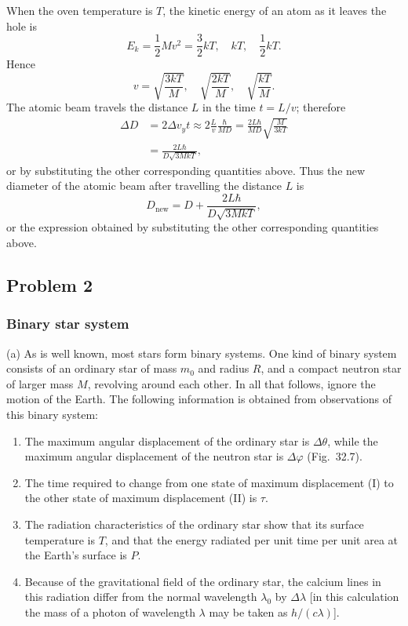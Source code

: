 When the oven temperature is $T$, the kinetic energy of an atom as it leaves the hole is
\[
E_k=\frac{1}{2}Mv^2=\frac{3}{2}kT,\quad kT,\quad \frac{1}{2}kT.
\]
Hence
\[
v=\sqrt{\frac{3kT}{M}},\quad \sqrt{\frac{2kT}{M}},\quad \sqrt{\frac{kT}{M}}.
\]
The atomic beam travels the distance $L$ in the time $t=L/v$; therefore
\begin{align*}
\Delta D&=2\Delta v_y t\approx2\frac{L}{v}\frac{\hbar}{MD}
=\frac{2L\hbar}{MD}\sqrt{\frac{M}{3kT}}\\
&=\frac{2L\hbar}{D\sqrt{3MkT}},
\end{align*}
or by substituting the other corresponding quantities above. Thus the new diameter of the atomic beam after travelling the distance $L$ is
\[
D_{\text{new}}=D+\frac{2L\hbar}{D\sqrt{3MkT}},
\]
or the expression obtained by substituting the other corresponding quantities above.

\subsection*{Problem 2}

\subsubsection*{Binary star system}

(a) As is well known, most stars form binary systems. One kind of binary system consists of an ordinary star of mass $m_0$ and radius $R$, and a compact neutron star of larger mass $M$, revolving around each other. In all that follows, ignore the motion of the Earth. The following information is obtained from observations of this binary system:

\begin{enumerate}
\item[(1)] The maximum angular displacement of the ordinary star is $\Delta\theta$, while the maximum angular displacement of the neutron star is $\Delta\varphi$ (Fig.~32.7).
\item[(2)] The time required to change from one state of maximum displacement (I) to the other state of maximum displacement (II) is $\tau$.
\item[(3)] The radiation characteristics of the ordinary star show that its surface temperature is $T$, and that the energy radiated per unit time per unit area at the Earth's surface is $P$.
\item[(4)] Because of the gravitational field of the ordinary star, the calcium lines in this radiation differ from the normal wavelength $\lambda_0$ by $\Delta\lambda$ [in this calculation the mass of a photon of wavelength $\lambda$ may be taken as $h/(c\lambda)$].
\end{enumerate}

